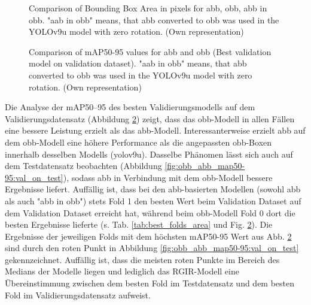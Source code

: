 \begin{figure}[htbp]
    \centering
    
    \caption[Comparison of Bounding Box Area in pixels for \acrshort{abb}, \acrshort{obb}, abb in obb]{Comparison of Bounding Box Area in pixels for \acrshort{abb}, \acrshort{obb}, abb in obb. "aab in obb" means, that \acrlong{abb} converted to obb was used in the \acrshort{YOLO}v9u model with zero rotation. (Own representation)}
    \label{fig:bbox_area}
\end{figure}


\begin{figure}[htbp]
    \centering
    
    \caption[Comparison of \acrshort{mAP}50-95 values for \acrshort{abb} and \acrshort{obb} (Best validation model on validation dataset)]{Comparison of \acrshort{mAP}50-95 values for \acrshort{abb} and \acrshort{obb} (Best validation model on validation dataset). "aab in obb" means, that \acrlong{abb} converted to obb was used in the \acrshort{YOLO}v9u model with zero rotation. (Own representation)}
    \label{fig:obb_abb_map50-95:val_on_val}
\end{figure}
Die Analyse der \acrshort{mAP}50--95 des besten Validierungsmodells auf dem Validierungsdatensatz (Abbildung \ref{fig:obb_abb_map50-95:val_on_val}) zeigt, dass das \acrshort{obb}-Modell in allen Fällen eine bessere Leistung erzielt als das \acrshort{abb}-Modell. Interessanterweise erzielt \acrshort{abb} auf dem \acrshort{obb}-Modell eine höhere Performance als die angepassten \acrshort{obb}-Boxen innerhalb desselben Modells (yolov9u). Dasselbe Phänomen lässt sich auch auf dem Testdatensatz beobachten (Abbildung \ref{fig:obb_abb_map50-95:val_on_test}), sodass \acrshort{abb} in Verbindung mit dem \acrshort{obb}-Modell bessere Ergebnisse liefert. Auffällig ist, dass bei den \acrshort{abb}-basierten Modellen (sowohl \acrshort{abb} als auch "abb in obb") stets Fold 1 den besten Wert beim Validation Dataset auf dem Validation Dataset erreicht hat, während beim \acrshort{obb}-Modell Fold 0 dort die besten Ergebnisse lieferte (s. Tab. \ref{tab:best_folds_area} und Fig. \ref{fig:obb_abb_map50-95:val_on_val}). Die Ergebnisse der jeweiligen Folds mit dem höchsten \acrshort{mAP}50-95 Wert aus Abb. \ref{fig:obb_abb_map50-95:val_on_val} sind durch den roten Punkt in Abbildung \ref{fig:obb_abb_map50-95:val_on_test} gekennzeichnet. Auffällig ist, dass die meisten roten Punkte im Bereich des Medians der Modelle liegen und lediglich das \acrshort{RGIR}-Modell eine Übereinstimmung zwischen dem besten Fold im Testdatensatz und dem besten Fold im Validierungsdatensatz aufweist. 

